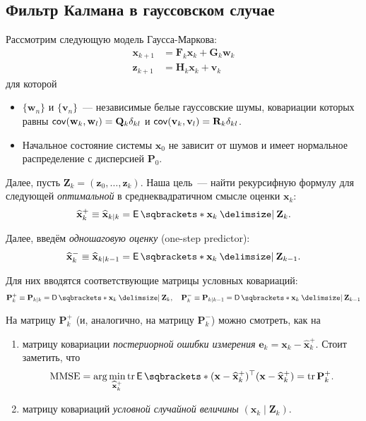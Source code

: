 \subsection{Фильтр Калмана в гауссовском случае}
Рассмотрим следующую модель Гаусса-Маркова:
\begin{align*}
	\mathbf{x}_{k + 1} &= \mathbf{F}_{k}\mathbf{x}_{k} + \mathbf{G}_{k} 
	\mathbf{w}_{k} \\
	\mathbf{z}_{k + 1} &= \mathbf{H}_{k}\mathbf{x}_{k} + \mathbf{v}_{k}
\end{align*}
для которой
\begin{itemize}
	\item \(\{\mathbf{w}_{n}\}\) и \(\{\mathbf{v}_{n}\}\)~--- независимые белые 
	гауссовские шумы, ковариации которых равны \(\operatorname{\mathsf{cov}}(\mathbf{w}_{k}, 
	\mathbf{w}_{l}) = \mathbf{Q}_{k}\delta_{kl}\) и \(\operatorname{\mathsf{cov}}(\mathbf{v}_{k}, 
	\mathbf{v}_{l}) = \mathbf{R}_{k}\delta_{kl}\).
	\item Начальное состояние системы \(\mathbf{x}_{0}\) не зависит от шумов и 
	имеет нормальное распределение с дисперсией \(\mathbf{P}_{0}\).
\end{itemize}

Далее, пусть \(\mathbf{Z}_{k} = (\mathbf{z}_{0}, \ldots, \mathbf{z}_{k})\). 
Наша цель~--- найти рекурсифную формулу для следующей \emph{оптимальной} в 
среднеквадратичном смысле оценки \(\mathbf{x}_{k}\):
\[
	\hat{\mathbf{x}}_{k}^{+} \equiv \hat{\mathbf{x}}_{k \mid k} = 
	\E{\mathbf{x}_{k} \given \mathbf{Z}_{k}}.
\]

Далее, введём \emph{одношаговую оценку} (one-step predictor):
\[
	\hat{\mathbf{x}}_{k}^{-} \equiv \hat{\mathbf{x}}_{k \mid k - 1} = 
	\E{\mathbf{x}_{k} \given \mathbf{Z}_{k - 1}}.
\]

Для них вводятся соответствующие матрицы условных ковариаций:
\[
	\mathbf{P}_{k}^{+} \equiv \mathbf{P}_{k \mid k} = \D{\mathbf{x}_{k} \given 
	\mathbf{Z}_{k}}, \quad \mathbf{P}_{k}^{-} \equiv \mathbf{P}_{k \mid k - 1} 
	= \D{\mathbf{x}_{k} \given \mathbf{Z}_{k - 1}}
\]

\begin{remark}
	На матрицу \(\mathbf{P}_{k}^{+}\) (и, аналогично, на матрицу 
	\(\mathbf{P}_{k}^{-}\)) можно смотреть, как на
	\begin{enumerate}
		\item матрицу ковариации \emph{постериорной ошибки измерения} 
		\(\mathbf{e}_{k} = \mathbf{x}_{k} - \hat{\mathbf{x}}_{k}^{+}\). Стоит 
		заметить, что
		\[
			\mathrm{MMSE} = \arg\min_{\hat{\mathbf{x}}_{k}^{+}} 
			\tr{\E{(\mathbf{x} - \hat{\mathbf{x}}_{k}^{+})^{\top} 
			(\mathbf{x} - \hat{\mathbf{x}}_{k}^{+})}} = \tr{\mathbf{P}_{k}^{+}}.
		\]
		
		\item матрицу ковариаций \emph{условной случайной величины} 
		\((\mathbf{x}_{k} \mid \mathbf{Z}_{k})\).
	\end{enumerate}
\end{remark}

